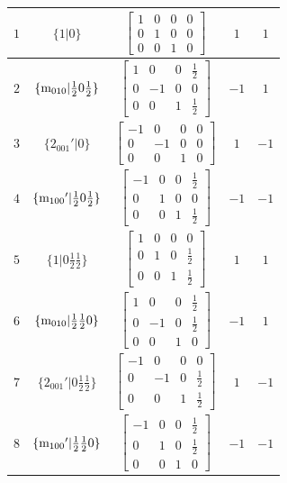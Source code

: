 \documentclass[fleqn,8pt]{jsarticle}
\begin{document}
\begin{longtable}{ccccc}
$ 1 $ & $ \{1|0\} $ & $ \begin{bmatrix} 1 & 0 & 0 & 0 \\ 0 & 1 & 0 & 0 \\ 0 & 0 & 1 & 0 \end{bmatrix} $ & $ 1 $ & $ 1 $ \\ \hline
$ 2 $ & $ \{{\rm m}_{010}|\frac{1}{2} 0 \frac{1}{2}\} $ & $ \begin{bmatrix} 1 & 0 & 0 & \frac{1}{2} \\ 0 & -1 & 0 & 0 \\ 0 & 0 & 1 & \frac{1}{2} \end{bmatrix} $ & $ -1 $ & $ 1 $ \\ \hline
$ 3 $ & $ \{2{}_{001}{}'|0\} $ & $ \begin{bmatrix} -1 & 0 & 0 & 0 \\ 0 & -1 & 0 & 0 \\ 0 & 0 & 1 & 0 \end{bmatrix} $ & $ 1 $ & $ -1 $ \\ \hline
$ 4 $ & $ \{{\rm m}_{100}{}'|\frac{1}{2} 0 \frac{1}{2}\} $ & $ \begin{bmatrix} -1 & 0 & 0 & \frac{1}{2} \\ 0 & 1 & 0 & 0 \\ 0 & 0 & 1 & \frac{1}{2} \end{bmatrix} $ & $ -1 $ & $ -1 $ \\ \hline
$ 5 $ & $ \{1|0 \frac{1}{2} \frac{1}{2}\} $ & $ \begin{bmatrix} 1 & 0 & 0 & 0 \\ 0 & 1 & 0 & \frac{1}{2} \\ 0 & 0 & 1 & \frac{1}{2} \end{bmatrix} $ & $ 1 $ & $ 1 $ \\ \hline
$ 6 $ & $ \{{\rm m}_{010}|\frac{1}{2} \frac{1}{2} 0\} $ & $ \begin{bmatrix} 1 & 0 & 0 & \frac{1}{2} \\ 0 & -1 & 0 & \frac{1}{2} \\ 0 & 0 & 1 & 0 \end{bmatrix} $ & $ -1 $ & $ 1 $ \\ \hline
$ 7 $ & $ \{2{}_{001}{}'|0 \frac{1}{2} \frac{1}{2}\} $ & $ \begin{bmatrix} -1 & 0 & 0 & 0 \\ 0 & -1 & 0 & \frac{1}{2} \\ 0 & 0 & 1 & \frac{1}{2} \end{bmatrix} $ & $ 1 $ & $ -1 $ \\ \hline
$ 8 $ & $ \{{\rm m}_{100}{}'|\frac{1}{2} \frac{1}{2} 0\} $ & $ \begin{bmatrix} -1 & 0 & 0 & \frac{1}{2} \\ 0 & 1 & 0 & \frac{1}{2} \\ 0 & 0 & 1 & 0 \end{bmatrix} $ & $ -1 $ & $ -1 $ \\
\end{longtable}
\end{document}
